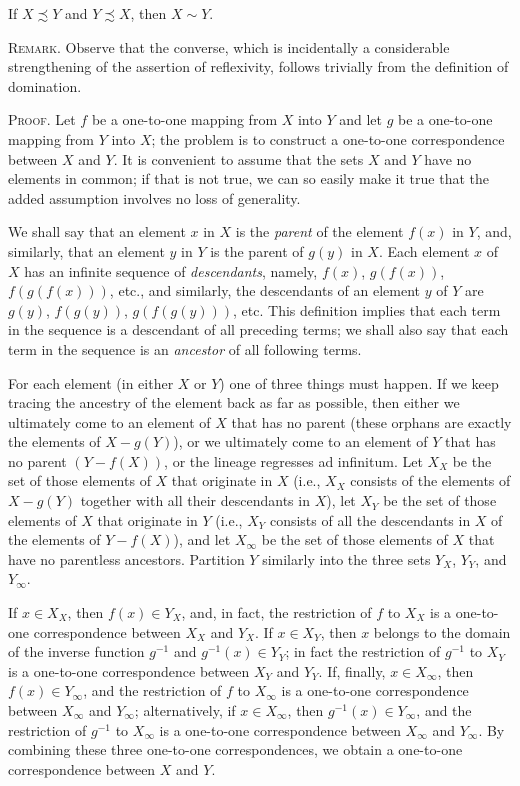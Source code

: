\begin{named} If $X \precsim Y$ and $Y \precsim X$, then $X \sim Y$.
\end{named}

\textsc{Remark}. Observe that the converse, which is incidentally a considerable strengthening of the assertion of reflexivity, follows trivially from the definition of domination. 

\textsc{Proof}. Let $f$ be a one-to-one mapping from $X$ into $Y$ and let $g$ be a one-to-one mapping from $Y$ into $X$; the problem is to construct a one-to-one correspondence between $X$ and $Y$. It is convenient to assume that the sets $X$ and $Y$ have no elements in common; if that is not true, we can so easily make it true that the added assumption  involves no loss of generality. 

We shall say that an element $x$ in $X$ is the \textit{parent} of the element $f(x)$ in $Y$, and, similarly, that an element $y$ in $Y$ is the parent of $g(y)$ in $X$. Each element $x$ of $X$ has an infinite sequence of \textit{descendants}, namely, $f(x)$, $g(f(x))$, $f(g(f(x)))$, etc., and similarly, the descendants of an element $y$ of $Y$ are $g(y)$, $f(g(y))$, $g(f(g(y)))$, etc. This definition implies that each term in the sequence is a descendant of all preceding terms; we shall also say that each term in the sequence is an \textit{ancestor} of all following terms. 

For each element (in either $X$ or $Y$) one of three things must happen. If we keep tracing the ancestry of the element back as far as possible, then either we ultimately come to an element of $X$ that has no parent (these orphans are exactly the elements of $X - g(Y)$), or we ultimately come to an element of $Y$ that has no parent $(Y - f(X))$, or the lineage regresses ad infinitum. Let $X_{X}$ be the set of those elements of $X$ that originate in $X$ (i.e., $X_{X}$ consists of the elements of $X - g(Y)$ together with all their descendants in $X$), let $X_{Y}$ be the set of those elements of $X$ that originate in $Y$ (i.e., $X_{Y}$ consists of all the descendants in $X$ of the elements of $Y - f(X)$), and let $X_{\infty}$ be the set of those elements of $X$ that have no parentless ancestors. Partition $Y$ similarly into the three sets $Y_{X}$, $Y_{Y}$, and $Y_{\infty}$. 

If $x \in X_{X}$, then $f(x) \in Y_{X}$, and, in fact, the restriction of $f$ to $X_{X}$ is a one-to-one correspondence between $X_{X}$ and $Y_{X}$. If $x \in X_{Y}$, then $x$ belongs to the domain of the inverse function $g^{-1}$ and $g^{-1}(x) \in Y_{Y}$; in fact the restriction of $g^{-1}$ to $X_{Y}$ is a one-to-one correspondence between $X_{Y}$ and $Y_{Y}$. If, finally, $x \in X_{\infty}$, then $f(x) \in Y_{\infty}$, and the restriction of $f$ to $X_{\infty}$ is a one-to-one correspondence between $X_{\infty}$ and  $Y_{\infty}$; alternatively, if $x \in X_{\infty}$, then $g^{-1}(x) \in Y_{\infty}$, and the restriction of $g^{-1}$ to $X_{\infty}$ is a one-to-one correspondence between $X_{\infty}$ and $Y_{\infty}$. By combining these three one-to-one correspondences, we obtain a one-to-one correspondence between $X$ and $Y$. 

